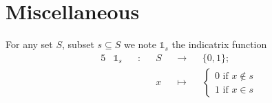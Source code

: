 \section*{Miscellaneous}
For any set $S$, subset $s \subseteq S$ we note $\mathds{1}_{s}$ the indicatrix function
\begin{alignat*}{5}
	&\mathds{1}_{s} &&:&& S &&\rightarrow&& \{0, 1\};\\
	& && && x && \mapsto &&
		\begin{cases}
			0 \text{ if } x \notin s\\
			1 \text{ if } x \in s
		\end{cases}
\end{alignat*}















